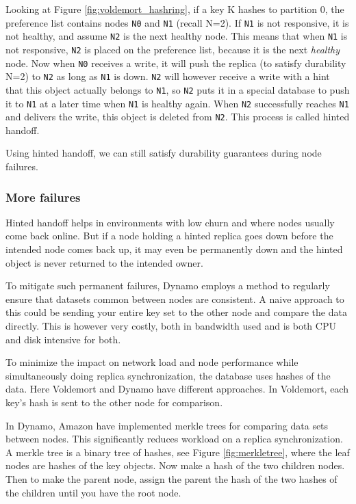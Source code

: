 Looking at Figure \ref{fig:voldemort_hashring}, if a key K hashes to partition 0, the preference list contains nodes \texttt{N0} and \texttt{N1} (recall N=2).
If \texttt{N1} is not responsive, it is not healthy, and assume \texttt{N2} is the next healthy node.
This means that when \texttt{N1} is not responsive, \texttt{N2} is placed on the preference list, because it is the next \emph{healthy} node.
Now when \texttt{N0} receives a write, it will push the replica (to satisfy durability N=2) to \texttt{N2} as long as \texttt{N1} is down.
\texttt{N2} will however receive a write with a hint that this object actually belongs to \texttt{N1}, so \texttt{N2} puts it in a special database to push it to \texttt{N1} at a later time when \texttt{N1} is healthy again. When \texttt{N2} successfully reaches \texttt{N1} and delivers the write, this object is deleted from \texttt{N2}. 
This process is called hinted handoff. 

Using hinted handoff, we can still satisfy durability guarantees during node failures.

\subsubsection{More failures}
Hinted handoff helps in environments with low churn and where nodes usually come back online. But if a node holding a hinted replica goes down before the intended node comes back up, it may even be permanently down and the hinted object is never returned to the intended owner.

To mitigate such permanent failures, Dynamo\cite{dynamo} employs a method to regularly ensure that datasets common between nodes are consistent. A naive approach to this could be sending your entire key set to the other node and compare the data directly.
This is however very costly, both in bandwidth used and is both CPU and disk intensive for both.

To minimize the impact on network load and node performance while simultaneously doing replica synchronization, the database uses hashes of the data. Here Voldemort and Dynamo have different approaches. In Voldemort, each key's hash is sent to the other node for comparison.

In Dynamo, Amazon have implemented merkle trees for comparing data sets between nodes. This significantly reduces workload on a replica synchronization.
A merkle tree is a binary tree of hashes, see Figure \ref{fig:merkletree}, where the leaf nodes are hashes of the key objects.
Now make a hash of the two children nodes.
Then to make the parent node, assign the parent the hash of the two hashes of the children until you have the root node. 

